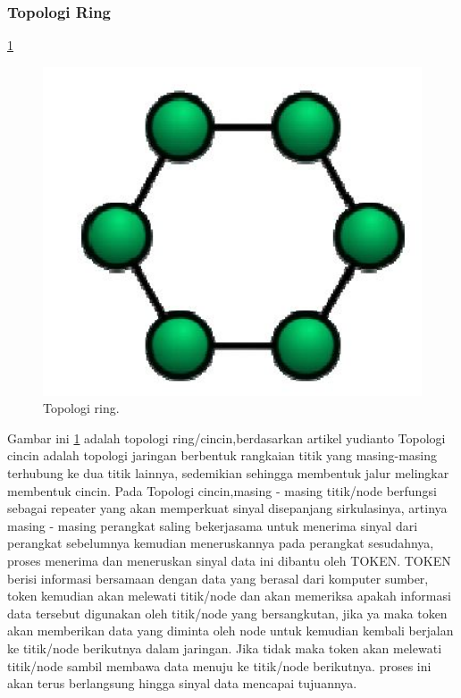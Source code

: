   \subsubsection{Topologi Ring}
    \ref{ring}
    \begin{figure}[ht]
    \centerline{\includegraphics[width=1\textwidth]{figures/ring.JPG}}
    \caption{Topologi ring.}
    \label{ring}
    \end{figure}
    Gambar ini \ref{ring} adalah topologi ring/cincin,berdasarkan artikel yudianto Topologi cincin adalah topologi jaringan berbentuk rangkaian titik yang masing-masing terhubung ke dua titik lainnya, sedemikian sehingga membentuk jalur melingkar membentuk cincin\cite{yudianto2007jaringan}. Pada Topologi cincin,masing - masing titik/node berfungsi sebagai repeater yang akan memperkuat sinyal disepanjang sirkulasinya, artinya masing - masing perangkat saling bekerjasama untuk menerima sinyal dari perangkat sebelumnya kemudian meneruskannya pada perangkat sesudahnya, proses menerima dan meneruskan sinyal data ini dibantu oleh TOKEN. TOKEN berisi informasi bersamaan dengan data yang berasal dari komputer sumber, token kemudian akan melewati titik/node dan akan memeriksa apakah informasi data tersebut digunakan oleh titik/node yang bersangkutan, jika ya maka token akan memberikan data yang diminta oleh node untuk kemudian kembali berjalan ke titik/node berikutnya dalam jaringan. Jika tidak maka token akan melewati titik/node sambil membawa data menuju ke titik/node berikutnya. proses ini akan terus berlangsung hingga sinyal data mencapai tujuannya.
